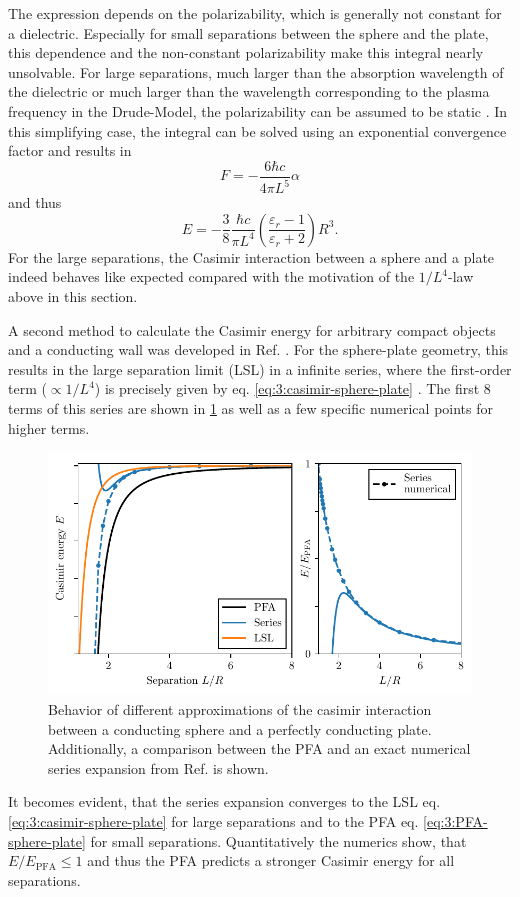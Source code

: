 The expression depends on the polarizability, which is generally not constant for a dielectric. Especially for small separations between the sphere and the plate, this dependence and the non-constant polarizability make this integral nearly unsolvable.
For large separations, much larger than the absorption wavelength of the dielectric or much larger than the wavelength corresponding to the plasma frequency in the Drude-Model, the polarizability can be assumed to be static \cite{Ford_1998,Kamp_2020}. In this simplifying case, the integral can be solved using an exponential convergence factor and results in
\begin{equation}
  F = -\frac{6 \hbar c}{4 \pi L^5} \alpha
\end{equation}
and thus 
\begin{equation}\label{eq:3:casimir-sphere-plate}
  E = -\frac{3}{8}\frac{\hbar c}{\pi L^4} \left(\frac{\varepsilon_r - 1}{\varepsilon_r + 2}\right)R^3 .
\end{equation}
For the large separations, the Casimir interaction between a sphere and a plate indeed behaves like expected compared with the motivation of the $1/L^4$-law above in this section.

A second method to calculate the Casimir energy for arbitrary compact objects and a conducting wall was developed in Ref. \cite{Emig_2007}. For the sphere-plate geometry, this results in the large separation limit (LSL) in a infinite series, where the first-order term ($\propto 1/L^4$) is precisely given by eq. \eqref{eq:3:casimir-sphere-plate} \cite{Emig_2007a,Pirozhenko_2013}. The first 8 terms of this series are shown in \cref{fig:3:casimir-behavior} as well as a few specific numerical points for higher terms.
\begin{figure}[!ht]
  \centering
  \includegraphics[width=\textwidth]{./../figures/casimir/casimir-behavior.pdf}
  \caption{Behavior of different approximations of the casimir interaction between a conducting sphere and a perfectly conducting plate. Additionally, a comparison between the PFA and an exact numerical series expansion from Ref. \cite{Emig_2007a} is shown.}
  \label{fig:3:casimir-behavior}
\end{figure}
It becomes evident, that the series expansion converges to the LSL eq. \eqref{eq:3:casimir-sphere-plate} for large separations and to the PFA eq. \eqref{eq:3:PFA-sphere-plate} for small separations.
Quantitatively the numerics show, that $E/E_\mathrm{PFA} \leq 1$ and thus the PFA predicts a stronger Casimir energy for all separations.

